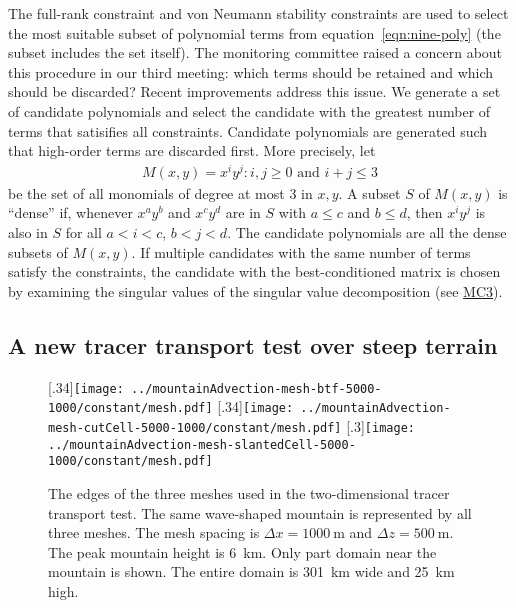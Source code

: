 \documentclass[a4paper,11pt]{article}
\begin{document}
The full-rank constraint and von Neumann stability constraints are used to select the most suitable subset of polynomial terms from equation~\eqref{eqn:nine-poly} (the subset includes the set itself).
The monitoring committee raised a concern about this procedure in our third meeting: which terms should be retained and which should be discarded?  Recent improvements address this issue.  We generate a set of candidate polynomials and select the candidate with the greatest number of terms that satisifies all constraints.  Candidate polynomials are generated such that high-order terms are discarded first.  More precisely, let
\begin{align}
	M(x, y) = { x^i y^j : i,j \geq 0 \text{ and } i+j \leq 3 }
\end{align}
be the set of all monomials of degree at most \num{3} in $x, y$.
A subset $S$ of $M(x,y)$ is ``dense'' if, whenever $x^a y^b$ and $x^c y^d$ are in $S$ with $a \leq c$ and $b \leq d$, then $x^i y^j$ is also in $S$ for all $a < i < c$, $b < j < d$.  The candidate polynomials are all the dense subsets of $M(x,y)$.  If multiple candidates with the same number of terms satisfy the constraints, the candidate with the best-conditioned matrix is chosen by examining the singular values of the singular value decomposition (see \href{http://www.datumedge.co.uk/publications/mc-report-2016-05.pdf}{MC3}).

\subsection*{A new tracer transport test over steep terrain}

\begin{figure}
	\centering
	[.34\linewidth]{\texttt{[image: ../mountainAdvection-mesh-btf-5000-1000/constant/mesh.pdf]}}
	[.34\linewidth]{\texttt{[image: ../mountainAdvection-mesh-cutCell-5000-1000/constant/mesh.pdf]}}
	[.3\linewidth]{\texttt{[image: ../mountainAdvection-mesh-slantedCell-5000-1000/constant/mesh.pdf]}}
	\caption{The edges of the three meshes used in the two-dimensional tracer transport test.  The same wave-shaped mountain is represented by all three meshes.  The mesh spacing is $\Delta x = \SI{1000}{\meter}$ and $\Delta z = \SI{500}{\meter}$.  The peak mountain height is \SI{6}{\kilo\meter}.  Only part domain near the mountain is shown.  The entire domain is \SI{301}{\kilo\meter} wide and \SI{25}{\kilo\meter} high.}
	\label{fig:meshes}
\end{figure}
\end{document}

